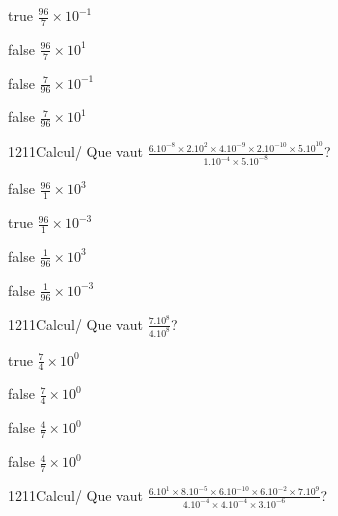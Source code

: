 \documentclass[11pt]{article}
\begin{document}
            \begin{reponses}
                \item[true] $\frac{96}{7}\times 10^{-1}$
                \item[false] $\frac{96}{7}\times 10^{1}$
                \item[false] $\frac{7}{96}\times 10^{-1}$
                \item[false] $\frac{7}{96}\times 10^{1}$
            \end{reponses}
            
            \begin{question}{1211}{Calcul}{}{/}
                Que vaut $\frac{6.10^{-8}\times 2.10^{2}\times 4.10^{-9}\times 2.10^{-10}\times 5.10^{10}}{1.10^{-4}\times 5.10^{-8}}$?
            \end{question}
            
            \begin{reponses}
                \item[false] $\frac{96}{1}\times 10^{3}$
                \item[true] $\frac{96}{1}\times 10^{-3}$
                \item[false] $\frac{1}{96}\times 10^{3}$
                \item[false] $\frac{1}{96}\times 10^{-3}$
            \end{reponses}
            
            \begin{question}{1211}{Calcul}{}{/}
                Que vaut $\frac{7.10^{8}}{4.10^{8}}$?
            \end{question}
            
            \begin{reponses}
                \item[true] $\frac{7}{4}\times 10^{0}$
                \item[false] $\frac{7}{4}\times 10^{0}$
                \item[false] $\frac{4}{7}\times 10^{0}$
                \item[false] $\frac{4}{7}\times 10^{0}$
            \end{reponses}
            
            \begin{question}{1211}{Calcul}{}{/}
                Que vaut $\frac{6.10^{1}\times 8.10^{-5}\times 6.10^{-10}\times 6.10^{-2}\times 7.10^{9}}{4.10^{-4}\times 4.10^{-4}\times 3.10^{-6}}$?
            \end{question}
            
\end{document}
